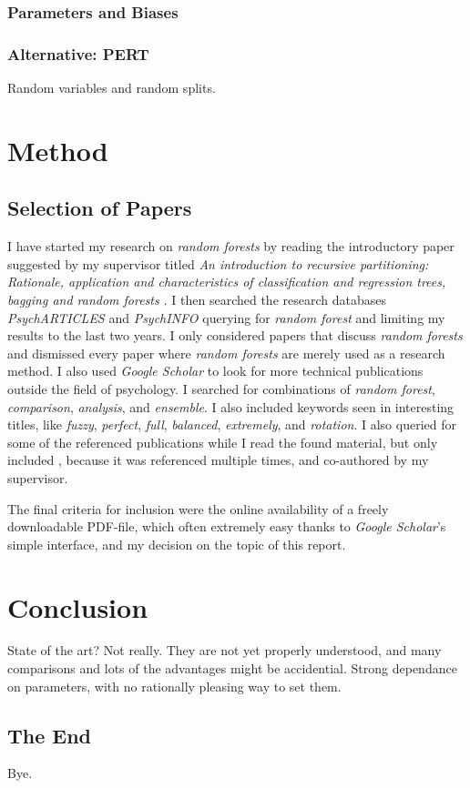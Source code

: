 \documentclass[a4paper,man,12pt,apacite]{apa6} %
\begin{document}
\subsubsection{Parameters and Biases}

\subsubsection{Alternative: PERT}
Random variables and random splits.

\section{Method}

\subsection{Selection of Papers}
I have started my research on \emph{random forests} by reading the
introductory paper suggested by my supervisor titled
\emph{An introduction to recursive partitioning: Rationale, application
and characteristics of classification and regression trees, bagging and
random forests \cite{strobl2009introduction}}. I then searched
the research databases \emph{PsychARTICLES} and \emph{PsychINFO}
querying for \emph{random forest} and limiting my results to the last
two years.
I only considered papers that discuss \emph{random forests} and dismissed
every paper where \emph{random forests} are merely used as a research
method. I also used \emph{Google Scholar} to look for more technical
publications outside the field of psychology. I searched for combinations
of \emph{random forest}, \emph{comparison}, \emph{analysis},
and \emph{ensemble}. I also included keywords seen in interesting titles,
like \emph{fuzzy}, \emph{perfect}, \emph{full}, \emph{balanced},
\emph{extremely}, and \emph{rotation}.
I also queried for some of the referenced publications while I read the
found material, but only included \cite{strobl2008conditional}, because
it was referenced multiple times, and co-authored by my supervisor.

The final criteria for inclusion were the online availability of a freely
downloadable PDF-file, which often extremely easy thanks to
\emph{Google Scholar}'s simple interface, and my decision on the topic of
this report.

\section{Conclusion}
State of the art? Not really. They are not yet properly understood, and
many comparisons and lots of the advantages might be accidential.
Strong dependance on parameters, with no rationally pleasing way to set them.

\subsection{The End}
Bye.


\end{document}
